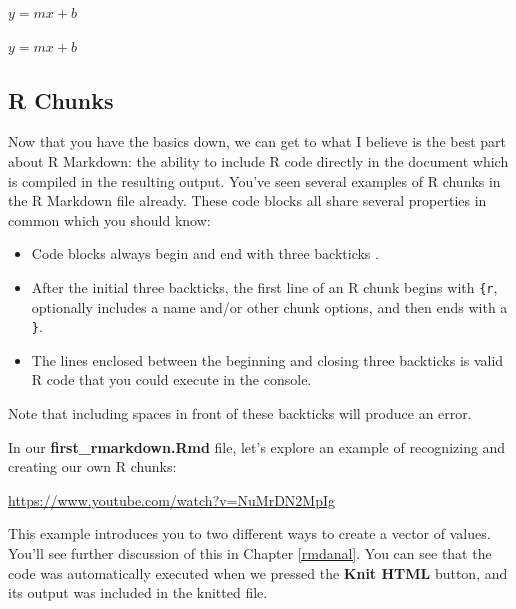 \documentclass[]{tufte-book}
\newenvironment{Shaded}{\begin{snugshade}}{\end{snugshade}}
\newcommand{\NormalTok}[1]{#1}
\providecommand{\tightlist}{%
  \setlength{\itemsep}{0pt}\setlength{\parskip}{0pt}}
\begin{document}
\begin{Shaded}
\begin{Highlighting}[]
\NormalTok{$y = mx + b$}
\end{Highlighting}
\end{Shaded}

\(y = mx + b\)

\subsection{R Chunks}\label{r-chunks}

Now that you have the basics down, we can get to what I believe is the best part about R Markdown: the ability to include R code directly in the document which is compiled in the resulting output. You've seen several examples of R chunks in the R Markdown file already. These code blocks all share several properties in common which you should know:

\begin{itemize}
\tightlist
\item
  Code blocks always begin and end with three backticks \texttt{\textasciigrave{}\textasciigrave{}\textasciigrave{}}.
\item
  After the initial three backticks, the first line of an R chunk begins with \texttt{\{r}, optionally includes a name and/or other chunk options, and then ends with a \texttt{\}}.
\item
  The lines enclosed between the beginning and closing three backticks is valid R code that you could execute in the console.
\end{itemize}

Note that including spaces in front of these backticks will produce an error.

In our \textbf{first\_rmarkdown.Rmd} file, let's explore an example of recognizing and creating our own R chunks:

\vspace{0.1in}\begin{center}\footnotesize{\url{https://www.youtube.com/watch?v=NuMrDN2MpIg}}\end{center}\vspace{0.1in}

This example introduces you to two different ways to create a vector of values. You'll see further discussion of this in Chapter \ref{rmdanal}. You can see that the code was automatically executed when we pressed the \textbf{Knit HTML} button, and its output was included in the knitted file.
\end{document}
